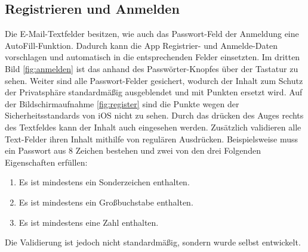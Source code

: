 \documentclass[notables, nomenclature, oneside, 150]{HSMW-Thesis}
\begin{document}
		\subsection{Registrieren und Anmelden}
			Die E-Mail-Textfelder besitzen, wie auch das Passwort-Feld der Anmeldung eine AutoFill-Funktion. Dadurch kann die App Registrier- und Anmelde-Daten vorschlagen und automatisch in die entsprechenden Felder einsetzten. Im dritten Bild \ref{fig:anmelden} ist das anhand des \glqq Passwörter\grqq -Knopfes über der Tastatur zu sehen. Weiter sind alle Passwort-Felder gesichert, wodurch der Inhalt zum Schutz der Privatsphäre standardmäßig ausgeblendet und mit Punkten ersetzt wird. Auf der Bildschirmaufnahme \ref{fig:register} sind die Punkte wegen der Sicherheitsstandards von iOS nicht zu sehen. Durch das drücken des Auges rechts des Textfeldes kann der Inhalt auch eingesehen werden. Zusätzlich validieren alle Text-Felder ihren Inhalt mithilfe von regulären Ausdrücken. Beispielsweise muss ein Passwort aus 8 Zeichen bestehen und zwei von den drei Folgenden Eigenschaften erfüllen:
			\vspace{-5mm}
			\begin{enumerate}
				\item Es ist mindestens ein Sonderzeichen enthalten.
				\item Es ist mindestens ein Großbuchstabe enthalten.
				\item Es ist mindestens eine Zahl enthalten.
			\end{enumerate}
			\vspace{-5mm}
			Die Validierung ist jedoch nicht standardmäßig, sondern wurde selbst entwickelt.
			
\end{document}
